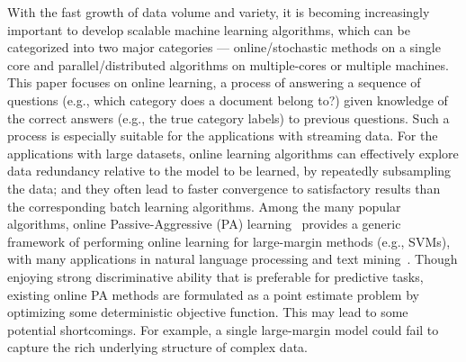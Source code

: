 \documentclass[twoside,11pt]{article}
\begin{document}

With the fast growth of data volume and variety, it is becoming increasingly important to develop scalable machine learning algorithms, which can be categorized into two major categories --- online/stochastic methods on a single core and parallel/distributed algorithms on multiple-cores or multiple machines. %
This paper focuses on online learning, a process of answering a sequence of questions (e.g., which category does a document belong to?) given knowledge of the correct answers (e.g., the true category labels) to previous questions. Such a process is especially suitable for the applications with streaming data. For the applications with large datasets, online learning algorithms can effectively explore data redundancy relative to the model to be learned, by repeatedly subsampling the data; and they often lead to faster convergence to satisfactory results than the corresponding batch learning  algorithms. Among the many popular algorithms, online Passive-Aggressive (PA) learning~\citep{crammer2006pa} provides a generic framework of performing online learning for large-margin methods (e.g., SVMs), with many applications in natural language processing and text mining~\citep{McDonald2005parsing, chiang2008emnlp}. Though enjoying strong discriminative ability that is preferable for predictive tasks, existing online PA methods are formulated as a point estimate problem by optimizing some deterministic objective function. This may lead to some potential shortcomings. For example, a single large-margin model could fail to capture the rich underlying structure of complex data. %
\end{document}
